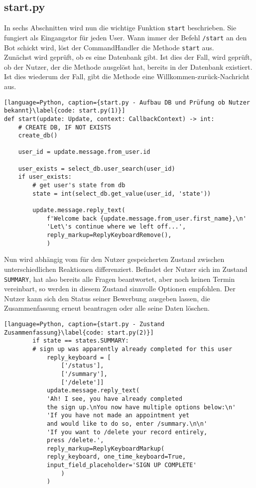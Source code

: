         \subsection{start.py} \label{Implementierung: start.py}
        In sechs Abschnitten wird nun die wichtige Funktion \verb|start| beschrieben. Sie fungiert als Eingangstor für jeden User. Wann immer der Befehl \verb|/start| an den Bot schickt wird, löst der CommandHandler die Methode \verb|start| aus.\\
        Zunächst wird geprüft, ob es eine Datenbank gibt. Ist dies der Fall, wird geprüft, ob der Nutzer, der die Methode ausgelöst hat, bereits in der Datenbank existiert. Ist dies wiederum der Fall, gibt die Methode eine Willkommen-zurück-Nachricht aus.

            \begin{lstlisting}[language=Python, caption={start.py - Aufbau DB und Prüfung ob Nutzer bekannt}\label{code: start.py(1)}]
def start(update: Update, context: CallbackContext) -> int:
    # CREATE DB, IF NOT EXISTS
    create_db()

    user_id = update.message.from_user.id

    user_exists = select_db.user_search(user_id)
    if user_exists:
        # get user's state from db
        state = int(select_db.get_value(user_id, 'state'))

        update.message.reply_text(
            f'Welcome back {update.message.from_user.first_name},\n'
            'Let\'s continue where we left off...',
            reply_markup=ReplyKeyboardRemove(),
            )
            \end{lstlisting}
            Nun wird abhängig vom für den Nutzer gespeicherten Zustand zwischen unterschiedlichen Reaktionen differenziert. Befindet der Nutzer sich im Zustand \verb|SUMMARY|, hat also bereits alle Fragen beantwortet, aber noch keinen Termin vereinbart, so werden in diesem Zustand sinnvolle Optionen empfohlen. Der Nutzer kann sich den Status seiner Bewerbung ausgeben lassen, die Zusammenfassung erneut beantragen oder alle seine Daten löschen.
            \begin{lstlisting}[language=Python, caption={start.py - Zustand Zusammenfassung}\label{code: start.py(2)}]
        if state == states.SUMMARY:  
        # sign up was apparently already completed for this user
            reply_keyboard = [
                ['/status'], 
                ['/summary'],
                ['/delete']]
            update.message.reply_text(
            'Ah! I see, you have already completed 
            the sign up.\nYou now have multiple options below:\n'
            'If you have not made an appointment yet 
            and would like to do so, enter /summary.\n\n'
            'If you want to /delete your record entirely, 
            press /delete.',
            reply_markup=ReplyKeyboardMarkup(
            reply_keyboard, one_time_keyboard=True, 
            input_field_placeholder='SIGN UP COMPLETE'
                )
            )
            \end{lstlisting}
